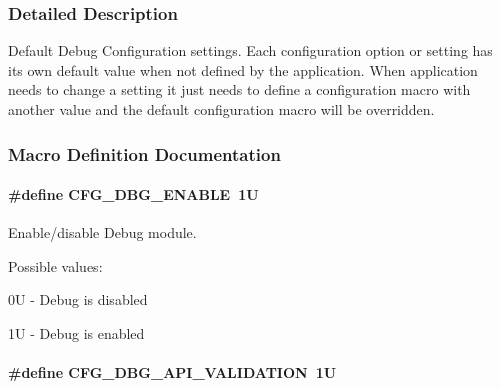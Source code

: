 \subsubsection{Detailed Description}
Default Debug Configuration settings. Each configuration option or setting has its own default value when not defined by the application. When application needs to change a setting it just needs to define a configuration macro with another value and the default configuration macro will be overridden. 

\subsubsection{Macro Definition Documentation}
\hypertarget{group__template__dbg__cfg_ga2ee37a5fa7efdba7d0014328e6c623a8}{
\paragraph[{C\-F\-G\-\_\-\-D\-B\-G\-\_\-\-E\-N\-A\-B\-L\-E}]{\setlength{\rightskip}{0pt plus 5cm}\#define C\-F\-G\-\_\-\-D\-B\-G\-\_\-\-E\-N\-A\-B\-L\-E~1\-U}}\label{group__template__dbg__cfg_ga2ee37a5fa7efdba7d0014328e6c623a8}


Enable/disable Debug module. 

Possible values\-:
\begin{DoxyItemize}
\item 0\-U -\/ Debug is disabled
\item 1\-U -\/ Debug is enabled 
\end{DoxyItemize}\hypertarget{group__template__dbg__cfg_ga64e39c477ef9d900b82585150329e3f0}{
\paragraph[{C\-F\-G\-\_\-\-D\-B\-G\-\_\-\-A\-P\-I\-\_\-\-V\-A\-L\-I\-D\-A\-T\-I\-O\-N}]{\setlength{\rightskip}{0pt plus 5cm}\#define C\-F\-G\-\_\-\-D\-B\-G\-\_\-\-A\-P\-I\-\_\-\-V\-A\-L\-I\-D\-A\-T\-I\-O\-N~1\-U}}\label{group__template__dbg__cfg_ga64e39c477ef9d900b82585150329e3f0}


